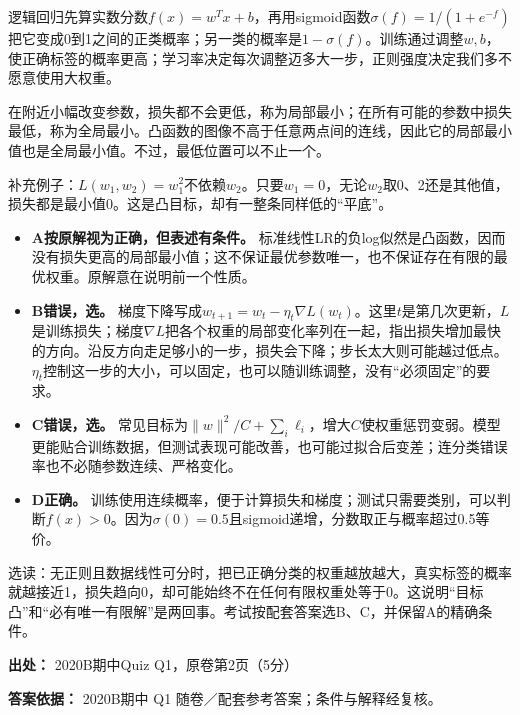 逻辑回归先算实数分数\(f(x)=w^Tx+b\)，再用sigmoid函数\(\sigma(f)=1/(1+e^{-f})\)把它变成0到1之间的正类概率；另一类的概率是\(1-\sigma(f)\)。训练通过调整\(w,b\)，使正确标签的概率更高；学习率决定每次调整迈多大一步，正则强度决定我们多不愿意使用大权重。


在附近小幅改变参数，损失都不会更低，称为局部最小；在所有可能的参数中损失最低，称为全局最小。凸函数的图像不高于任意两点间的连线，因此它的局部最小值也是全局最小值。不过，最低位置可以不止一个。


补充例子：\(L(w_1,w_2)=w_1^2\)不依赖\(w_2\)。只要\(w_1=0\)，无论\(w_2\)取0、2还是其他值，损失都是最小值0。这是凸目标，却有一整条同样低的“平底”。



\begin{itemize}

\item \textbf{A按原解视为正确，但表述有条件。} 标准线性LR的负log似然是凸函数，因而没有损失更高的局部最小值；这不保证最优参数唯一，也不保证存在有限的最优权重。原解意在说明前一个性质。

\item \textbf{B错误，选。} 梯度下降写成\(w_{t+1}=w_t-\eta_t\nabla L(w_t)\)。这里\(t\)是第几次更新，\(L\)是训练损失；梯度\(\nabla L\)把各个权重的局部变化率列在一起，指出损失增加最快的方向。沿反方向走足够小的一步，损失会下降；步长太大则可能越过低点。\(\eta_t\)控制这一步的大小，可以固定，也可以随训练调整，没有“必须固定”的要求。

\item \textbf{C错误，选。} 常见目标为\(\|w\|^2/C+\sum_i\ell_i\)，增大\(C\)使权重惩罚变弱。模型更能贴合训练数据，但测试表现可能改善，也可能过拟合后变差；连分类错误率也不必随参数连续、严格变化。

\item \textbf{D正确。} 训练使用连续概率，便于计算损失和梯度；测试只需要类别，可以判断\(f(x)>0\)。因为\(\sigma(0)=0.5\)且sigmoid递增，分数取正与概率超过0.5等价。

\end{itemize}


选读：无正则且数据线性可分时，把已正确分类的权重越放越大，真实标签的概率就越接近1，损失趋向0，却可能始终不在任何有限权重处等于0。这说明“目标凸”和“必有唯一有限解”是两回事。考试按配套答案选B、C，并保留A的精确条件。


\textbf{出处：} 2020B期中Quiz Q1，原卷第2页（5分）


\textbf{答案依据：} 2020B期中 Q1 随卷／配套参考答案；条件与解释经复核。
